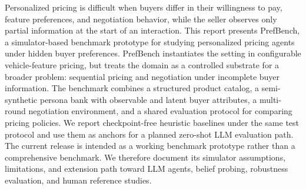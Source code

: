 Personalized pricing is difficult when buyers differ in their willingness to pay, feature preferences, and negotiation behavior, while the seller observes only partial information at the start of an interaction. This report presents PrefBench, a simulator-based benchmark prototype for studying personalized pricing agents under hidden buyer preferences. PrefBench instantiates the setting in configurable vehicle-feature pricing, but treats the domain as a controlled substrate for a broader problem: sequential pricing and negotiation under incomplete buyer information. The benchmark combines a structured product catalog, a semi-synthetic persona bank with observable and latent buyer attributes, a multi-round negotiation environment, and a shared evaluation protocol for comparing pricing policies. We report checkpoint-free heuristic baselines under the same test protocol and use them as anchors for a planned zero-shot LLM evaluation path. The current release is intended as a working benchmark prototype rather than a comprehensive benchmark. We therefore document its simulator assumptions, limitations, and extension path toward LLM agents, belief probing, robustness evaluation, and human reference studies.
